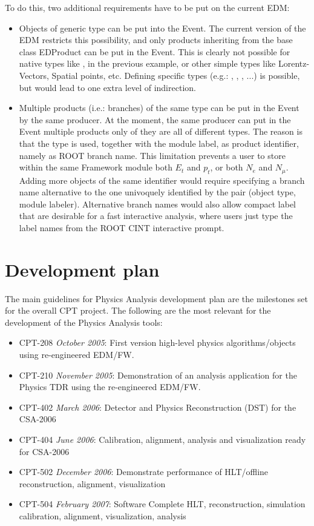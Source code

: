 \documentclass[draftmode]{memarticle}
\begin{document}
To do this, two additional requirements have to be put on 
the current EDM:
\begin{itemize}
\item{} Objects of generic type can be put into the Event. The current
version of the EDM restricts this possibility, and only products 
inheriting from the base class {EDProduct} can be put in the Event. 
This is clearly not possible for native types like , 
 in the previous example, or other simple types like 
Lorentz-Vectors, Spatial points, etc. Defining specific types
(e.g.: , ,
, ...) is possible, but would
lead to one extra level of indirection.

\item{} Multiple products (i.e.: branches) of the same type
can be put in the Event by the same producer. At the moment, the 
same producer can put in the Event multiple products only of
they are all of different types. The reason is that the type is 
used, together with the module label, as product identifier,
namely as ROOT branch name.
This limitation prevents a user to store within the same 
Framework module both $E_t$ and $p_t$, or both $N_e$ and $N_\mu$.
Adding more objects of the same identifier would require specifying
a branch name alternative to the one univoquely identified by the pair 
(object type, module labeler). Alternative branch names would also 
allow compact label that are desirable for a fast interactive analysis,
where users just type the label names from the ROOT CINT interactive prompt.
\end{itemize}

\chapter{Development plan}

The main guidelines for Physics Analysis development plan
are the milestones set for the overall CPT project.
The following are the most relevant for the development of the
Physics Analysis tools:

\begin{itemize}
\item{CPT-208} {\em October 2005}: First version high-level physics algorithms/objects 
using re-engineered EDM/FW.
\item{CPT-210} {\em November 2005}: Demonstration of an analysis application for 
the Physics TDR using the re-engineered EDM/FW. 
\item{CPT-402} {\em March 2006}: Detector and Physics Reconstruction (DST) for the CSA-2006 
\item{CPT-404} {\em June 2006}: Calibration, alignment, analysis and visualization ready for 
CSA-2006
\item{CPT-502} {\em December 2006}: Demonstrate performance of HLT/offline reconstruction, 
alignment, visualization 
\item{CPT-504} {\em February 2007}: Software Complete HLT, reconstruction, simulation 
calibration, alignment, visualization, analysis
\end{itemize}
\end{document}
